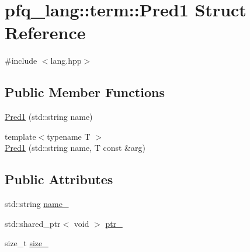 \hypertarget{structpfq__lang_1_1term_1_1Pred1}{\section{pfq\+\_\+lang\+:\+:term\+:\+:Pred1 Struct Reference}
\label{structpfq__lang_1_1term_1_1Pred1}
}


{\ttfamily \#include $<$lang.\+hpp$>$}

\subsection*{Public Member Functions}
\begin{DoxyCompactItemize}
\item 
\hyperlink{structpfq__lang_1_1term_1_1Pred1_a02ac41bef185feeb0e03a557b8f9524b}{Pred1} (std\+::string name)
\item 
{\footnotesize template$<$typename T $>$ }\\\hyperlink{structpfq__lang_1_1term_1_1Pred1_a03e16b9dfb73db543c9c38e0a2e3c553}{Pred1} (std\+::string name, T const \&arg)
\end{DoxyCompactItemize}
\subsection*{Public Attributes}
\begin{DoxyCompactItemize}
\item 
std\+::string \hyperlink{structpfq__lang_1_1term_1_1Pred1_a2e8fa633d20f23a5bda4f1d1d2d7c40a}{name\+\_\+}
\item 
std\+::shared\+\_\+ptr$<$ void $>$ \hyperlink{structpfq__lang_1_1term_1_1Pred1_aab8272102e260db367460682dc3f51c5}{ptr\+\_\+}
\item 
size\+\_\+t \hyperlink{structpfq__lang_1_1term_1_1Pred1_a00e31cd95cdaeed41806c33a487072f8}{size\+\_\+}
\end{DoxyCompactItemize}


